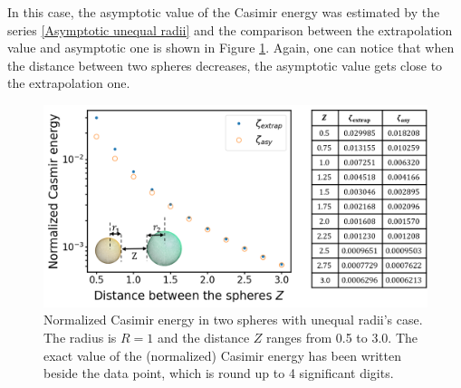 In this case, the asymptotic value of the Casimir 
energy was estimated by the series \eqref{Asymptotic unequal radii} and the comparison between the extrapolation value and asymptotic one is shown in Figure 
\ref{Casimir energy between spheres with unequal radii}. Again, one can notice that when the distance between two spheres decreases, the asymptotic value gets 
close to the extrapolation one.
\begin{figure}[H]
    \centering
    \includegraphics[width = \textwidth]{figures/Spheres_unequal_CasE.png}
    \caption{Normalized Casimir energy in two spheres with unequal radii's case. The radius is $R = 1$ and the distance $Z$ 
    ranges from 0.5 to 3.0. The exact value of the (normalized) Casimir energy has been written 
    beside the data point, which is round up to 4 significant digits.}
    \label{Casimir energy between spheres with unequal radii}
\end{figure}


